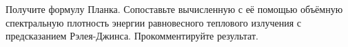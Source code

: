 \documentclass[__main__.tex]{subfiles}
\begin{document}
Получите формулу Планка. Сопоставьте вычисленную с её помощью объёмную спектральную плотность энергии равновесного теплового излучения с предсказанием Рэлея-Джинса. Прокомментируйте результат.\\ 

\end{document}
